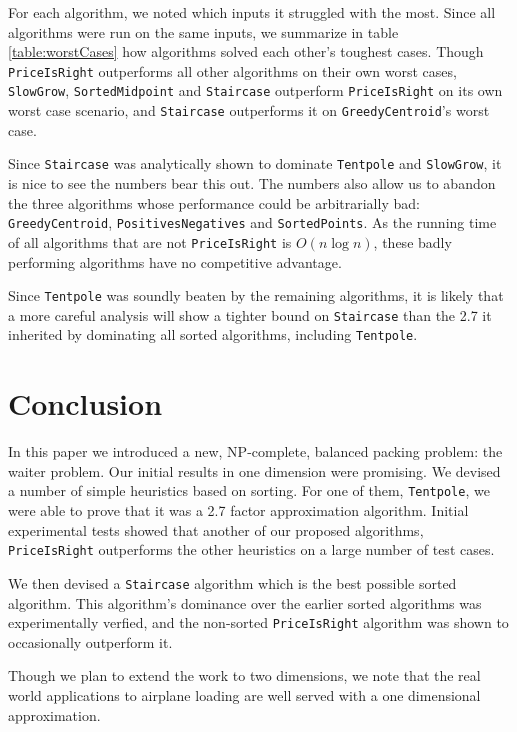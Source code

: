For each algorithm, we noted which inputs it struggled with the most.  Since all algorithms were run on the same inputs, we summarize in table \ref{table:worstCases} how algorithms solved each other's toughest cases.  Though \texttt{PriceIsRight} outperforms all other algorithms on their own worst cases, \texttt{SlowGrow}, \texttt{SortedMidpoint} and \texttt{Staircase} outperform \texttt{PriceIsRight} on its own worst case scenario, and \texttt{Staircase} outperforms it on \texttt{GreedyCentroid}'s worst case.

Since \texttt{Staircase} was analytically shown to dominate \texttt{Tentpole} and \texttt{SlowGrow}, it is nice to see the numbers bear this out.  The numbers also allow us to abandon the three algorithms whose performance could be arbitrarially bad: \texttt{GreedyCentroid}, \texttt{PositivesNegatives} and \texttt{SortedPoints}.  As the running time of all algorithms that are not \texttt{PriceIsRight} is $O(n \log n)$, these badly performing algorithms have no competitive advantage.  

Since \texttt{Tentpole} was soundly beaten by the remaining algorithms, it is likely that a more careful analysis will show a tighter bound on \texttt{Staircase} than the 2.7 it inherited by dominating all sorted algorithms, including \texttt{Tentpole}.

\section{Conclusion}

In this paper we introduced a new, NP-complete, balanced packing problem: the waiter problem.  Our initial results in one dimension were promising.  We devised a number of simple heuristics based on sorting.  For one of them, \texttt{Tentpole}, we were able to prove that it was a 2.7 factor approximation algorithm.  Initial experimental tests showed that another of our proposed algorithms, \texttt{PriceIsRight} outperforms the other heuristics on a large number of test cases.

We then devised a \texttt{Staircase} algorithm which is the best possible sorted algorithm.  This algorithm's dominance over the earlier sorted algorithms was experimentally verfied, and the non-sorted \texttt{PriceIsRight} algorithm was shown to occasionally outperform it.

Though we plan to extend the work to two dimensions, we note that the real world applications to airplane loading are well served with a one dimensional approximation.  

